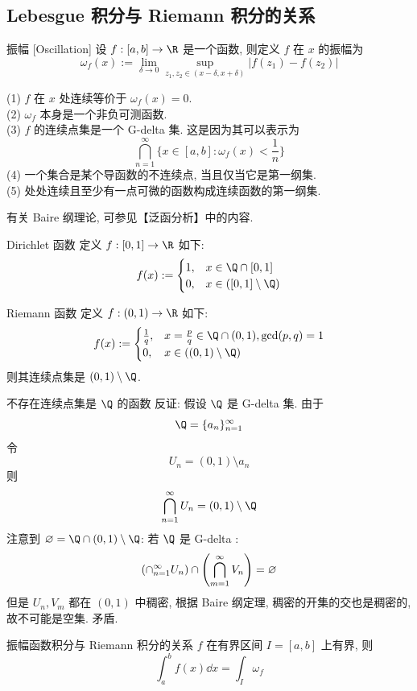 \subsection{Lebesgue 积分与 Riemann 积分的关系}
\begin{dfn}
    [oscillation]
    {振幅}
    [Oscillation]
    设 $f:[a,b]\to\R$ 是一个函数, 则定义 \(f\) 在 $x$ 的振幅为
    \[\omega_f(x):=\lim_{\delta\to 0}\sup_{z_1,z_2\in(x-\delta,x+\delta)} |f(z_1)-f(z_2)|\]
\end{dfn}
\begin{rmk}
    (1) \(f\) 在 \(x\) 处连续等价于 \(\omega_f(x)=0\).\\
    (2) \(\omega_f\) 本身是一个非负可测函数. \\
    (3) \(f\) 的连续点集是一个 G-delta 集. 这是因为其可以表示为
    \[\bigcap_{n=1}^{\infty} \{x\in[a,b]: \omega_f(x)<\frac{1}{n}\}\]
    (4) 一个集合是某个导函数的不连续点, 当且仅当它是第一纲集.\\
    (5) 处处连续且至少有一点可微的函数构成连续函数的第一纲集.
\end{rmk}
有关 Baire 纲理论, 可参见【泛函分析】中的内容.
\begin{ins}
    {Dirichlet 函数}
    定义 \(f:[0,1]\to\R\) 如下:
    \[f(x):=\begin{cases}
        1, & x\in\Q\cap[0,1]\\
        0, & x\in([0,1]\setminus\Q)
    \end{cases}\]
\end{ins}
\begin{ins}
    {Riemann 函数}
    定义 \(f:(0,1)\to\R\) 如下:
    \[f(x):=\begin{cases}
        \frac{1}{q}, & x=\frac{p}{q}\in\Q\cap(0,1), \gcd(p,q)=1\\
        0, & x\in((0,1)\setminus\Q)
    \end{cases}\]
    则其连续点集是 \((0,1)\setminus\Q\).
\end{ins}
\begin{cxmp}
    {不存在连续点集是 \(\Q\) 的函数}
    反证: 假设 \(\Q\) 是 G-delta 集. 由于
    \[\Q=\{a_n\}_{n=1}^\infty\]
    令
    \[U_n=(0,1)\setminus {a_n}\]
    则
    \[\bigcap_{n=1}^\infty U_n = (0,1)\setminus\Q\]
    注意到 \(\varnothing=\Q\cap (0,1)\setminus\Q\): 若 \(\Q\) 是 G-delta :
    \[\qty(\cap_{n=1}^{\infty}U_n)\cap\qty(\bigcap_{m=1}^{\infty}V_n)=\varnothing\]
    但是 \(U_n, V_m\) 都在 \((0,1)\) 中稠密, 根据 Baire 纲定理, 稠密的开集的交也是稠密的, 故不可能是空集. 矛盾.
\end{cxmp}
\begin{thm}
    {振幅函数积分与 Riemann 积分的关系}
    \(f\) 在有界区间 \(I=[a,b]\) 上有界, 则
    \[\int_a^b f(x)\dd{x}=\int_I \omega_f\]
\end{thm}
